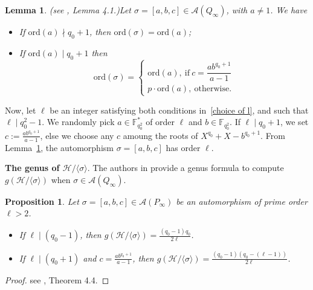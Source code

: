 \documentclass[10pt]{article}
\newtheorem{prop1}[thm]{Proposition}
\newtheorem{lem1}[thm]{Lemma}
\theoremstyle{definition}
\theoremstyle{definition}
\theoremstyle{definition}
\newcommand{\cd}{\cdot}
\newcommand{\calA}{\mathcal{A}}
\newcommand{\calH}{\mathcal{H}}
\begin{document}
\begin{lem1}(see \cite{Gar}, Lemma 4.1.)\label{ordsigma}
Let $\sigma = [a,b,c] \in \calA(Q_{\infty})$, with $a \neq 1$. We have
\begin{itemize}
\item[(i)] If $\mathrm{ord}(a) \nmid q_0+1$, then $\mathrm{ord}(\sigma) = \mathrm{ord}(a)$;
\item[(ii)] If $\mathrm{ord}(a) \mid q_0+1$ then
\begin{equation*}
\mathrm{ord}(\sigma) = \left\{\begin{array}{ll}
\mathrm{ord}(a), \ \mathrm{if} \ c=\dfrac{ab^{q_0+1}}{a-1} \\
p \cd \mathrm{ord}(a), \  \mathrm{otherwise}. 
\end{array}
\right.
\end{equation*}
\end{itemize}
\end{lem1}

Now, let $\ell$ be an integer satisfying both conditions in~\ref{choice of l}, and such that $\ell \mid q_0^2-1$. We randomly pick $a \in \mathbb{F}_{q_0^2}^*$ of order $\ell$ and $b \in \mathbb{F}_{q_0^2}$. If $\ell \mid q_0+1$, we set $c:=\frac{ab^{q_0+1}}{a-1}$, else we choose any $c$ amoung the roots of $X^{q_0}+X-b^{q_0+1}$. From Lemma~\ref{ordsigma}, the automorphism $\sigma = [a,b,c]$ has order $\ell$. 

\vspace*{0.2cm}

\noindent \textbf{The genus of $\calH/\langle \sigma \rangle$}. The authors in \cite{Gar} provide a genus formula to compute $g(\calH/\langle \sigma \rangle)$ when $\sigma \in \calA(Q_{\infty})$.

\begin{prop1} \label{genus}
Let $\sigma = [a,b,c] \in \calA(P_{\infty})$ be an automorphism of prime order $\ell > 2$.
\begin{itemize}
\item[(i)] If $\ell \mid (q_0-1)$, then $g(\calH/\langle \sigma \rangle) = \frac{(q_0-1)q_0}{2\ell}$.
\item[(ii)] If $\ell \mid (q_0+1)$ and $c = \frac{ab^{q_0+1}}{a-1}$, then $g(\calH/\langle \sigma \rangle) = \frac{(q_0-1)(q_0-(\ell-1))}{2\ell}$.
\end{itemize}
\end{prop1}

\begin{proof}
see \cite{Gar}, Theorem 4.4.
\end{proof}
\end{document}
